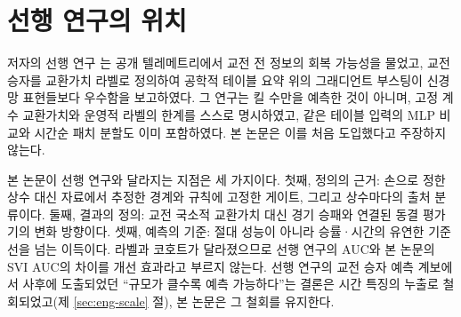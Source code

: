 \section{선행 연구의 위치}
\label{sec:rel-position}

저자의 선행 연구 \cite{baek2026killconditioned}는 공개 텔레메트리에서 교전 전 정보의 회복 가능성을 물었고, 교전 승자를 교환가치 라벨로 정의하여 공학적 테이블 요약 위의 그래디언트 부스팅이 신경망 표현들보다 우수함을 보고하였다. 그 연구는 킬 수만을 예측한 것이 아니며, 고정 계수 교환가치와 운영적 라벨의 한계를 스스로 명시하였고, 같은 테이블 입력의 MLP 비교와 시간순 패치 분할도 이미 포함하였다. 본 논문은 이를 처음 도입했다고 주장하지 않는다.

본 논문이 선행 연구와 달라지는 지점은 세 가지이다. 첫째, 정의의 근거: 손으로 정한 상수 대신 자료에서 추정한 경계와 규칙에 고정한 게이트, 그리고 상수마다의 출처 분류이다. 둘째, 결과의 정의: 교전 국소적 교환가치 대신 경기 승패와 연결된 동결 평가기의 변화 방향이다. 셋째, 예측의 기준: 절대 성능이 아니라 승률·시간의 유연한 기준선을 넘는 이득이다. 라벨과 코호트가 달라졌으므로 선행 연구의 AUC와 본 논문의 SVI AUC의 차이를 개선 효과라고 부르지 않는다. 선행 연구의 교전 승자 예측 계보에서 사후에 도출되었던 ``규모가 클수록 예측 가능하다''는 결론은 시간 특징의 누출로 철회되었고(제 \ref{sec:eng-scale} 절), 본 논문은 그 철회를 유지한다.
